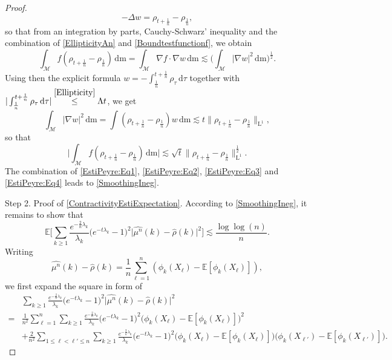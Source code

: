 \documentclass[11pt,a4paper,oneside]{amsart}
\numberwithin{equation}{section}
\newcommand{\dd}{\mathrm{d}}
\newcommand{\LL}{\mathrm{L}}
\newcommand{\m}{\mathrm{m}}
\begin{document}
\begin{proof}
%
$$-\Delta w=\rho_{t+\frac{1}{n}}-\rho_{\frac{1}{n}},$$
%
so that from an integration by parts, Cauchy-Schwarz' inequality and the combination of \eqref{EllipticityAn} and \eqref{Boundtestfunctionf}, we obtain
%
$$\int_{\mathcal{M}}f(\rho_{t+\frac{1}{n}}-\rho_{\frac{1}{n}})\,\dd\m=\int_{\mathcal{M}}\nabla f\cdot\nabla w\,\dd\m\lesssim \Big(\int_{\mathcal{M}}\vert\nabla w\vert^2\,\dd\m\Big)^{\frac{1}{2}}.$$
%
Using then the explicit formula $w=-\int_{\frac{1}{n}}^{t+\frac{1}{n}}\rho_{\tau}\,\dd\tau$ together with $\vert \int_{\frac{1}{n}}^{t+\frac{1}{n}}\rho_{\tau}\,\dd\tau\vert\stackrel{\eqref{Ellipticity}}{\leq} \Lambda t$, we get 
%
$$\int_{\mathcal{M}}\vert\nabla w\vert^2\,\dd\m=\int (\rho_{t+\frac{1}{n}}-\rho_{\frac{1}{n}})w\,\dd\m\lesssim t\|\rho_{t+\frac{1}{n}}-\rho_{\frac{1}{n}}\|_{\LL^1},$$
%
so that 
%
\begin{equation}\label{EstiPeyre:Eq3}
%
\Big\vert\int_{\mathcal{M}}f(\rho_{t+\frac{1}{n}}-\rho_{\frac{1}{n}})\,\dd\m\Big\vert\lesssim \sqrt{t}\|\rho_{t+\frac{1}{n}}-\rho_{\frac{1}{n}}\|^{\frac{1}{2}}_{\LL^1}.
%
\end{equation}
%
The combination of \eqref{EstiPeyre:Eq1}, \eqref{EstiPeyre:Eq2}, \eqref{EstiPeyre:Eq3} and \eqref{EstiPeyre:Eq4} leads to \eqref{SmoothingIneg}.

%
\medskip
%

{\sc Step 2. Proof of \eqref{ContractivityEstiExpectation}. }According to \eqref{SmoothingIneg}, it remains to show that 
%
\begin{equation}\label{ContractExpectation}
%
\mathbb{E}\bigg[\sum_{k\geq 1} \frac{e^{-\frac{2}{n}\lambda_k}}{\lambda_k}\big(e^{-t\lambda_k}-1\big)^2\vert\widehat{\mu^n}(k)-\widehat{\rho}(k)\vert^2\bigg]\lesssim \frac{\log\log(n)}{n}.
%
\end{equation}
%
Writing 
%
\begin{equation}\label{DecomposeFourier}
%
\widehat{\mu^n}(k)-\widehat{\rho}(k)=\frac{1}{n}\sum_{\ell=1}^n (\phi_k(X_\ell)-\mathbb{E}[\phi_k(X_\ell)]),
%
\end{equation}
%
we first expand the square in form of
%
\begin{equation}\label{SquareExpended}
%
\begin{aligned}
%
&\sum_{k\geq 1} \frac{e^{-\frac{2}{n}\lambda_k}}{\lambda_k}\big(e^{-t\lambda_k}-1\big)^2\vert\widehat{\mu^n}(k)-\widehat{\rho}(k)\vert^2\\
=&\frac{1}{n^2}\sum_{\ell=1}^n\sum_{k\geq 1} \frac{e^{-\frac{2}{n}\lambda_k}}{\lambda_k}\big(e^{-t\lambda_k}-1\big)^2\big(\phi_k(X_{\ell})-\mathbb{E}[\phi_k(X_\ell)]\big)^2\\
&+\frac{2}{n^2}\sum_{1\leq \ell<\ell'\leq n}\sum_{k\geq 1} \frac{e^{-\frac{2}{n}\lambda_k}}{\lambda_k}\big(e^{-t\lambda_k}-1\big)^2\big(\phi_k(X_{\ell})-\mathbb{E}[\phi_k(X_\ell)]\big)\big(\phi_k(X_{\ell'})-\mathbb{E}[\phi_k(X_{\ell'})]\big).
%
\end{aligned}
%
\end{equation}


\end{proof}
\end{document}
